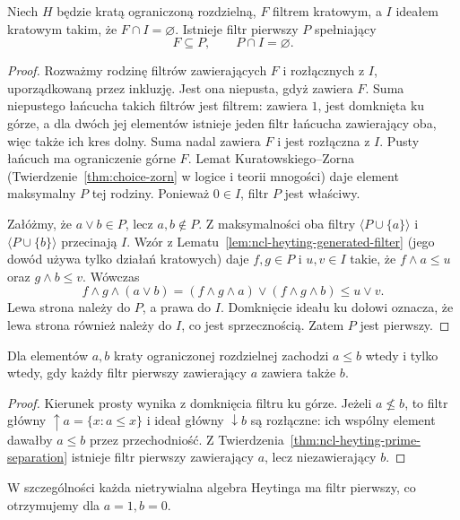 \begin{twierdzenie}
\label{thm:ncl-heyting-prime-separation}
Niech $H$ będzie kratą ograniczoną rozdzielną,
$F$ filtrem kratowym, a $I$ ideałem kratowym
takim, że $F\cap I=\varnothing$.
Istnieje filtr pierwszy $P$ spełniający
\[
 F\subseteq P,\qquad P\cap I=\varnothing.
\]
\end{twierdzenie}
\begin{proof}
Rozważmy rodzinę filtrów zawierających $F$
i rozłącznych z $I$, uporządkowaną przez inkluzję.
Jest ona niepusta, gdyż zawiera $F$.
Suma niepustego łańcucha takich filtrów
jest filtrem: zawiera $1$, jest domknięta ku górze,
a dla dwóch jej elementów istnieje jeden filtr
łańcucha zawierający oba, więc także ich kres dolny.
Suma nadal zawiera $F$ i jest rozłączna z $I$.
Pusty łańcuch ma ograniczenie górne $F$.
Lemat Kuratowskiego--Zorna
(Twierdzenie~\ref{thm:choice-zorn} w logice i teorii
mnogości) daje element maksymalny $P$ tej rodziny.
Ponieważ $0\in I$, filtr $P$ jest właściwy.

Załóżmy, że $a\vee b\in P$, lecz $a,b\notin P$.
Z maksymalności oba filtry
$\langle P\cup\{a\}\rangle$ i
$\langle P\cup\{b\}\rangle$ przecinają $I$.
Wzór z Lematu~\ref{lem:ncl-heyting-generated-filter}
(jego dowód używa tylko działań kratowych)
daje $f,g\in P$ i $u,v\in I$ takie, że
$f\wedge a\leq u$ oraz $g\wedge b\leq v$.
Wówczas
\[
 f\wedge g\wedge(a\vee b)
 = (f\wedge g\wedge a)\vee(f\wedge g\wedge b)
 \leq u\vee v.
\]
Lewa strona należy do $P$, a prawa do $I$.
Domknięcie ideału ku dołowi oznacza, że lewa
strona również należy do $I$, co jest sprzecznością.
Zatem $P$ jest pierwszy.
\end{proof}

\begin{wniosek}
\label{cor:ncl-heyting-prime-order-separation}
Dla elementów $a,b$ kraty ograniczonej rozdzielnej
zachodzi $a\leq b$ wtedy i tylko wtedy,
gdy każdy filtr pierwszy zawierający $a$
zawiera także $b$.
\end{wniosek}
\begin{proof}
Kierunek prosty wynika z domknięcia filtru ku górze.
Jeżeli $a\not\leq b$, to filtr główny
$\uparrow a=\{x:a\leq x\}$ i ideał główny
$\downarrow b$ są rozłączne: ich wspólny
element dawałby $a\leq b$ przez przechodniość.
Z Twierdzenia~\ref{thm:ncl-heyting-prime-separation}
istnieje filtr pierwszy zawierający $a$,
lecz niezawierający $b$.
\end{proof}
W szczególności każda nietrywialna algebra Heytinga
ma filtr pierwszy, co otrzymujemy dla $a=1,b=0$.

